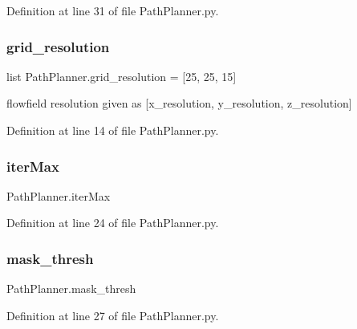 Definition at line 31 of file Path\+Planner.\+py.

\mbox{\label{namespace_path_planner_a528f4f5acdf39deff5b1d647a2a9c516}} 
\subsubsection{\texorpdfstring{grid\+\_\+resolution}{grid\_resolution}}
{\footnotesize\ttfamily list Path\+Planner.\+grid\+\_\+resolution = \mbox{[}25, 25, 15\mbox{]}}



flowfield resolution given as \mbox{[}x\+\_\+resolution, y\+\_\+resolution, z\+\_\+resolution\mbox{]} 



Definition at line 14 of file Path\+Planner.\+py.

\mbox{\label{namespace_path_planner_a3ca749ff6a20c496bffad71e3e58cc06}} 
\subsubsection{\texorpdfstring{iter\+Max}{iterMax}}
{\footnotesize\ttfamily Path\+Planner.\+iter\+Max}



Definition at line 24 of file Path\+Planner.\+py.

\mbox{\label{namespace_path_planner_ac923de4a9571b4f7df3ce753108c1fd1}} 
\subsubsection{\texorpdfstring{mask\+\_\+thresh}{mask\_thresh}}
{\footnotesize\ttfamily Path\+Planner.\+mask\+\_\+thresh}



Definition at line 27 of file Path\+Planner.\+py.

\mbox{\label{namespace_path_planner_a70f6ef5b1c5da8902eb5038847427be6}} 

